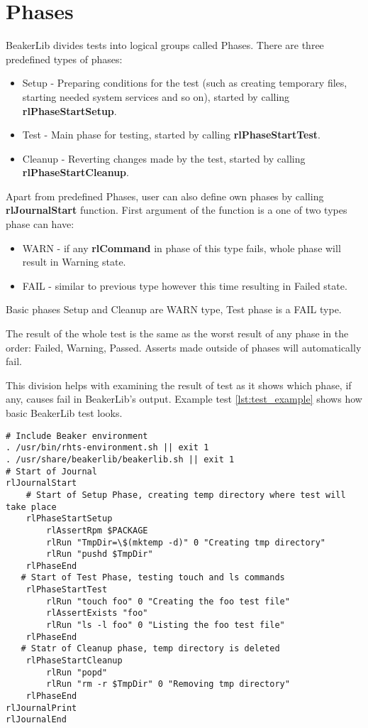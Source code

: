 \section{Phases}
BeakerLib divides tests into logical groups called Phases. There are three predefined types of phases:
\begin{itemize}
\item Setup - Preparing conditions for the test (such as creating temporary files, starting needed system services and so on), started by calling \textbf{rlPhaseStartSetup}.
\item Test - Main phase for testing, started by calling \textbf{rlPhaseStartTest}.
\item Cleanup - Reverting changes made by the test, started by calling \mbox{\textbf{rlPhaseStartCleanup}}.
\end{itemize}

Apart from predefined Phases, user can also define own phases by calling \textbf{rlJournalStart} function. First argument of the function is a one of two types phase can have:

\begin{itemize}
\item WARN - if any \textbf{rlCommand} in phase of this type fails, whole phase will result in Warning state.
\item FAIL - similar to previous type however this time resulting in Failed state.
\end{itemize}

Basic phases Setup and Cleanup are WARN type, Test phase is a FAIL type.

The result of the whole test is the same as the worst result of any phase in the order: Failed, Warning, Passed.
Asserts made outside of phases will automatically fail.

This division helps with examining the result of test as it shows which phase, if any, causes fail in BeakerLib's output. 
Example test \ref{lst:test_example} shows how basic BeakerLib test looks.
\\
\begin{lstlisting}[style=beakerlib_bash,caption={BeakerLib basic test example},label={lst:test_example}]
# Include Beaker environment
. /usr/bin/rhts-environment.sh || exit 1
. /usr/share/beakerlib/beakerlib.sh || exit 1
# Start of Journal
rlJournalStart
    # Start of Setup Phase, creating temp directory where test will take place 
    rlPhaseStartSetup
        rlAssertRpm $PACKAGE
        rlRun "TmpDir=\$(mktemp -d)" 0 "Creating tmp directory"
        rlRun "pushd $TmpDir"
    rlPhaseEnd
   # Start of Test Phase, testing touch and ls commands
    rlPhaseStartTest
        rlRun "touch foo" 0 "Creating the foo test file"
        rlAssertExists "foo"
        rlRun "ls -l foo" 0 "Listing the foo test file"
    rlPhaseEnd
   # Statr of Cleanup phase, temp directory is deleted
    rlPhaseStartCleanup
        rlRun "popd"
        rlRun "rm -r $TmpDir" 0 "Removing tmp directory"
    rlPhaseEnd
rlJournalPrint
rlJournalEnd
\end{lstlisting}

